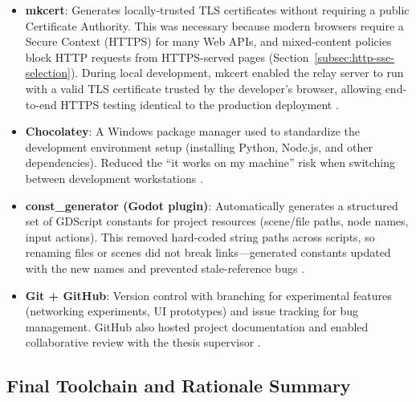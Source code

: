 \begin{itemize}
    \item \textbf{mkcert}: Generates locally-trusted TLS certificates without requiring a public Certificate Authority. This was necessary because modern browsers require a Secure Context (HTTPS) for many Web APIs, and mixed-content policies block HTTP requests from HTTPS-served pages (Section~\ref{subsec:http-sse-selection}). During local development, mkcert enabled the relay server to run with a valid TLS certificate trusted by the developer's browser, allowing end-to-end HTTPS testing identical to the production deployment \citep{mkcert_repo}.

    \item \textbf{Chocolatey}: A Windows package manager used to standardize the development environment setup (installing Python, Node.js, and other dependencies). Reduced the ``it works on my machine'' risk when switching between development workstations \citep{chocolatey_platform}.

    \item \textbf{const\_generator (Godot plugin)}: Automatically generates a structured set of GDScript constants for project resources (scene/file paths, node names, input actions). This removed hard-coded string paths across scripts, so renaming files or scenes did not break links---generated constants updated with the new names and prevented stale-reference bugs \citep{const_generator_asset}.

    \item \textbf{Git + GitHub}: Version control with branching for experimental features (networking experiments, UI prototypes) and issue tracking for bug management. GitHub also hosted project documentation and enabled collaborative review with the thesis supervisor \citep{git_scm,github_platform}.
\end{itemize}


\subsection{Final Toolchain and Rationale Summary}
\label{subsec:toolchain-summary}

